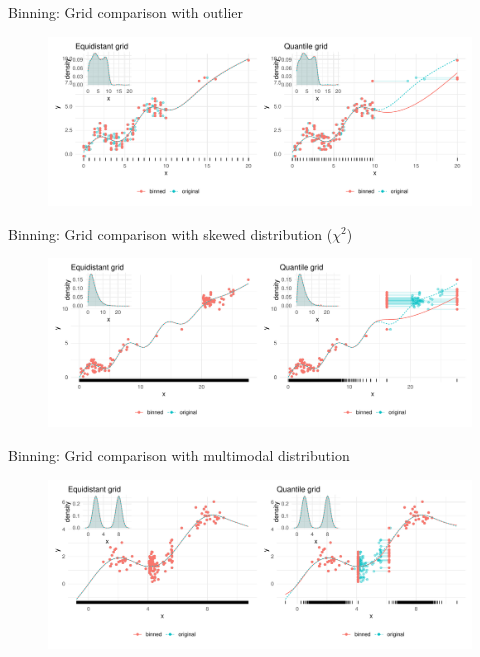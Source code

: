 \documentclass[t,10pt]{beamer}
\begin{document}
\begin{frame}{Binning: Grid comparison with outlier}
    \begin{figure}
        \centering
        \includegraphics[width=\textwidth]{figures/fig-bin-outlier.pdf}
    \end{figure} 
\end{frame}

\begin{frame}{Binning: Grid comparison with skewed distribution ($\chi^2$)}
    \begin{figure}
        \centering
        \includegraphics[width=\textwidth]{figures/fig-bin-chisq.pdf}
    \end{figure} 
\end{frame}

\begin{frame}{Binning: Grid comparison with multimodal distribution}
    \begin{figure}
        \centering
        \includegraphics[width=\textwidth]{figures/fig-bin-binormal.pdf}
    \end{figure} 
\end{frame}
\end{document}
